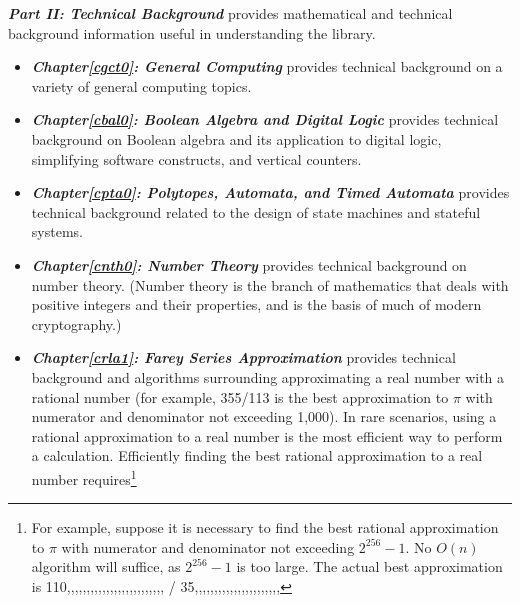 \emph{\textbf{Part II: Technical Background}} provides mathematical and 
technical background information useful in understanding the library.  

\begin{itemize}
\item \emph{\textbf{Chapter\postchapterwordnonstretchable{}\ref{cgct0}: 
      General Computing}} provides technical background on a variety of general 
      computing topics.  
\item \emph{\textbf{Chapter\postchapterwordnonstretchable{}\ref{cbal0}: 
      Boolean Algebra and Digital Logic}} provides technical background on 
      Boolean algebra and its application to digital logic, simplifying software 
      constructs, and vertical counters.  
\item \emph{\textbf{Chapter\postchapterwordnonstretchable{}\ref{cpta0}: 
      Polytopes, Automata, and Timed Automata}} provides technical background 
      related to the design of state machines and stateful systems.  
\item \emph{\textbf{Chapter\postchapterwordnonstretchable{}\ref{cnth0}: 
      Number Theory}} provides technical background on number theory.  (Number 
      theory is the branch of mathematics that deals with positive integers and 
      their properties, and is the basis of much of modern cryptography.) 
\item \emph{\textbf{Chapter\postchapterwordnonstretchable{}\ref{crla1}: 
      Farey Series Approximation}} provides technical background and algorithms 
      surrounding approximating a real number with a rational number (for 
      example, 355/113 is the best approximation to $\pi$ with numerator and 
      denominator not exceeding 1,000).  In rare scenarios, using a rational 
      approximation to a real number is the most efficient way to perform a 
      calculation.  Efficiently finding the best rational approximation to a 
      real number requires\footnote{For example, suppose it is necessary to find 
      the best rational approximation to $\pi$ with numerator and denominator 
      not exceeding $2^{256}-1$.  No $O(n)$ algorithm will suffice, as 
      $2^{256}-1$ is too large.  The actual best approximation is 
      110,,,,,,,,,,,,,,,,,,,,,,,,, / 35,,,,,,,,,,,,,,,,,,,,,,\-%
}
\end{itemize}

